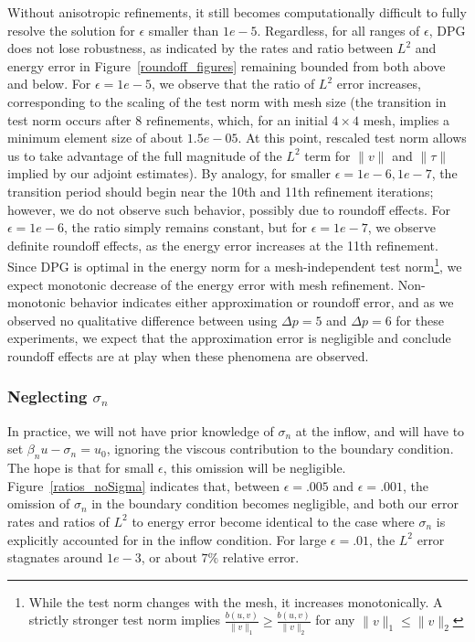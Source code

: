 \documentclass[11pt,onecolumn]{scrartcl}
\newcommand{\nor}[1]{\left\| #1 \right\|}
\newcommand{\Oh}{\Omega_h}
\newcommand{\grad}{\nabla}
\begin{document}
Without anisotropic refinements, it still becomes computationally difficult to fully resolve the solution for $\epsilon$ smaller than $1e-5$. Regardless, for all ranges of $\epsilon$, DPG does not lose robustness, as indicated by the rates and ratio between $L^2$ and energy error in Figure~\ref{roundoff_figures} remaining bounded from both above and below. For $\epsilon = 1e-5$, we observe that the ratio of $L^2$ error increases, corresponding to the scaling of the test norm with mesh size (the transition in test norm occurs after 8 refinements, which, for an initial $4\times 4$ mesh, implies a minimum element size of about $1.5e-05$. At this point, rescaled test norm allows us to take advantage of the full magnitude of the $L^2$ term for $\|v\|$ and $\|\tau\|$ implied by our adjoint estimates). By analogy, for smaller $\epsilon = 1e-6, 1e-7$, the transition period should begin near the 10th and 11th refinement iterations; however, we do not observe such behavior, possibly due to roundoff effects. 
For $\epsilon=1e-6$, the ratio simply remains constant, but for $\epsilon=1e-7$, we observe definite roundoff effects, as the energy error increases at the 11th refinement. Since DPG is optimal in the energy norm for a mesh-independent test norm\footnote{While the test norm changes with the mesh, it increases monotonically. A strictly stronger test norm implies $\frac{b(u,v)}{\|v\|_1} \geq \frac{b(u,v)}{\|v\|_2}$ for any $\|v\|_1 \leq \|v\|_2$}, we expect monotonic decrease of the energy error with mesh refinement. Non-monotonic behavior indicates either approximation or roundoff error, and as we observed no qualitative difference between using $\Delta p = 5$ and $\Delta p = 6$ for these experiments, we expect that the approximation error is negligible and conclude roundoff effects are at play when these phenomena are observed. 


\subsubsection{Neglecting $\sigma_n$}

In practice, we will not have prior knowledge of $\sigma_n$ at the inflow, and will have to set $\beta_n u - \sigma_n = u_0$, ignoring the viscous contribution to the boundary condition.  The hope is that for small $\epsilon$, this omission will be negligible. Figure~\ref{ratios_noSigma} indicates that, between $\epsilon = .005$ and $\epsilon = .001$, the omission of $\sigma_n$ in the boundary condition becomes negligible, and both our error rates and ratios of $L^2$ to energy error become identical to the case where $\sigma_n$ is explicitly accounted for in the inflow condition. For large $\epsilon = .01$, the $L^2$ error stagnates around $1e-3$, or about $7\%$ relative error. 
\end{document}
